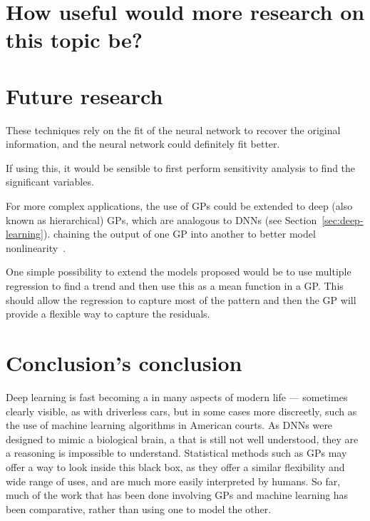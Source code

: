 \section{How useful would more research on this topic be?}

\section{Future research}

These techniques rely on the fit of the neural network to recover the original information, and the neural network could definitely fit better.

If using this, it would be sensible to first perform sensitivity analysis to find the significant variables.

For more complex applications, the use of \acp{GP} could be extended to deep (also known as hierarchical) \acp{GP}, which are analogous to \acp{DNN} (see Section~\ref{sec:deep-learning}).
 chaining the output of one \ac{GP} into another to better model nonlinearity~\autocite{damianou2013}.

One simple possibility to extend the models proposed would be to use multiple regression to find a trend and then use this as a mean function in a \ac{GP}.
This should allow the regression to capture most of the pattern and then the \ac{GP} will provide a flexible way to capture the residuals.

\section{Conclusion's conclusion}

Deep learning is fast becoming a  in many aspects of modern life --- sometimes clearly visible, as with driverless cars, but in some cases more discreetly, such as the use of machine learning algorithms in American courts.
As \acp{DNN} were designed to mimic a biological brain, a  that is still not well understood, they are a   reasoning is impossible to understand.
Statistical methods such as \acp{GP} may offer a way to look inside this black box, as they offer a similar flexibility and wide range of uses, and are much more easily interpreted by humans.
So far, much of the work that has been done involving \acp{GP} and machine learning has been comparative, rather than using one to model the other.
